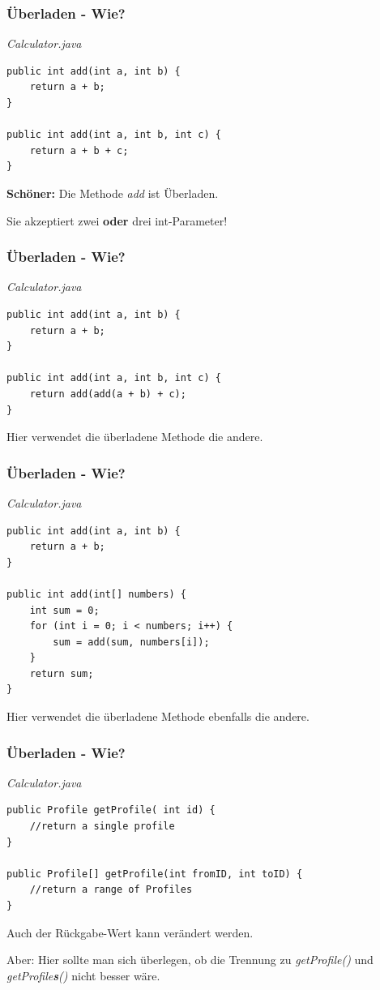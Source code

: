 \documentclass[18pt]{beamer}
\begin{document}

\begin{frame}[containsverbatim]
	\frametitle{Überladen - Wie?}
	
	\emph{Calculator.java}
	\begin{lstlisting}
public int add(int a, int b) {
	return a + b;
}

public int add(int a, int b, int c) {
	return a + b + c;
}
	\end{lstlisting}
	
	\textbf{Schöner:} Die Methode \emph{add} ist Überladen.
	
	Sie akzeptiert zwei \textbf{oder} drei int-Parameter!
\end{frame}


\begin{frame}[containsverbatim]
	\frametitle{Überladen - Wie?}
	
	\emph{Calculator.java}
	\begin{lstlisting}
public int add(int a, int b) {
	return a + b;
}

public int add(int a, int b, int c) {
	return add(add(a + b) + c);
}
	\end{lstlisting}
	
	Hier verwendet die überladene Methode die andere.
\end{frame}


\begin{frame}[containsverbatim]
	\frametitle{Überladen - Wie?}
	
	\emph{Calculator.java}
	\begin{lstlisting}
public int add(int a, int b) {
	return a + b;
}

public int add(int[] numbers) {
	int sum = 0;
	for (int i = 0; i < numbers; i++) {
		sum = add(sum, numbers[i]);
	}
	return sum;
}
	\end{lstlisting}
	
	Hier verwendet die überladene Methode ebenfalls die andere.
\end{frame}


\begin{frame}[containsverbatim]
	\frametitle{Überladen - Wie?}
	
	\emph{Calculator.java}
	\begin{lstlisting}
public Profile getProfile( int id) {
	//return a single profile
}

public Profile[] getProfile(int fromID, int toID) {
	//return a range of Profiles
}
	\end{lstlisting}
	
	Auch der Rückgabe-Wert kann verändert werden.
	
	
	Aber: Hier sollte man sich überlegen, ob die Trennung zu \emph{getProfile()} und \emph{getProfile\textbf{s}()} nicht besser wäre.
\end{frame}
\end{document}
